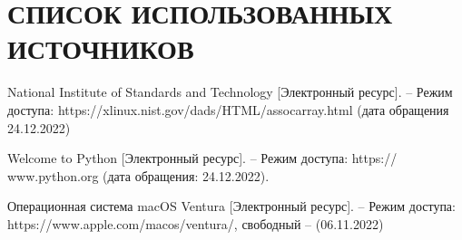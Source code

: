 \section*{СПИСОК ИСПОЛЬЗОВАННЫХ ИСТОЧНИКОВ}

\begingroup
\renewcommand{\section}[2]{}

\begin{thebibliography}{10}
		National Institute of Standards and Technology [Электронный ресурс]. -- Режим доступа:   https://xlinux.nist.gov/dads/HTML/assocarray.html (дата обращения 24.12.2022)
	
	 Welcome to Python [Электронный ресурс]. -- Режим доступа:  
	  https:// www.python.org (дата обращения: 24.12.2022).
	
	Операционная система macOS Ventura  [Электронный ресурс]. – Режим доступа: 
	https://www.apple.com/macos/ventura/, 
	свободный -- (06.11.2022)

\end{thebibliography}
\endgroup

\pagebreak





